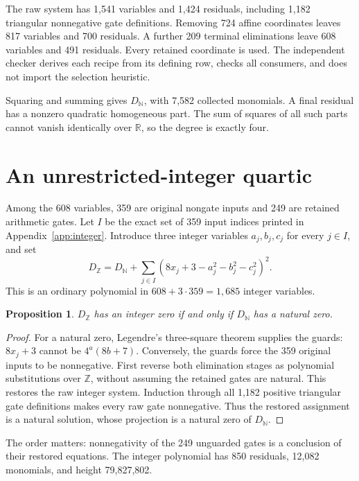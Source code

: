 \documentclass[11pt,letterpaper]{article}
\newcommand{\N}{\mathbb N}
\newcommand{\Z}{\mathbb Z}
\newtheorem{proposition}[theorem]{Proposition}
\theoremstyle{definition}\newtheorem{definition}[theorem]{Definition}
\theoremstyle{remark}\newtheorem{remark}[theorem]{Remark}
\begin{document}
The raw system has 1,541 variables and 1,424 residuals, including
1,182 triangular nonnegative gate definitions. Removing 724 affine
coordinates leaves 817 variables and 700 residuals. A further 209
terminal eliminations leave 608 variables and 491 residuals.
Every retained coordinate is used. The independent checker derives
each recipe from its defining row, checks all consumers, and does not
import the selection heuristic.

Squaring and summing gives $D_{\N}$, with 7,582 collected monomials.
A final residual has a nonzero quadratic homogeneous part.
The sum of squares of all such parts cannot vanish identically over
$\mathbb R$, so the degree is exactly four.

\section{An unrestricted-integer quartic}\label{sec:integer}

Among the 608 variables, 359 are original nongate inputs and 249
are retained arithmetic gates. Let $I$ be the exact set of 359 input
indices printed in Appendix~\ref{app:integer}. Introduce three
integer variables $a_j,b_j,c_j$ for every $j\in I$, and set
\begin{equation}\label{eq:integer}
 \boxed{D_{\Z}=D_{\N}+
  \sum_{j\in I}(8x_j+3-a_j^2-b_j^2-c_j^2)^2.}
\end{equation}
This is an ordinary polynomial in $608+3\cdot359=1,685$ integer variables.

\begin{proposition}
$D_{\Z}$ has an integer zero if and only if $D_{\N}$ has a natural zero.
\end{proposition}
\begin{proof}
For a natural zero, Legendre's three-square theorem supplies the guards:
$8x_j+3$ cannot be $4^a(8b+7)$.
Conversely, the guards force the 359 original inputs to be nonnegative.
First reverse both elimination stages as polynomial substitutions over
$\Z$, without assuming the retained gates are natural. This restores
the raw integer system. Induction through all 1,182 positive triangular
gate definitions makes every raw gate nonnegative. Thus the restored
assignment is a natural solution, whose projection is a natural zero
of $D_{\N}$.
\end{proof}
The order matters: nonnegativity of the 249 unguarded gates is a
conclusion of their restored equations. The integer polynomial has
850 residuals, 12,082 monomials, and height 79,827,802.
\end{document}
